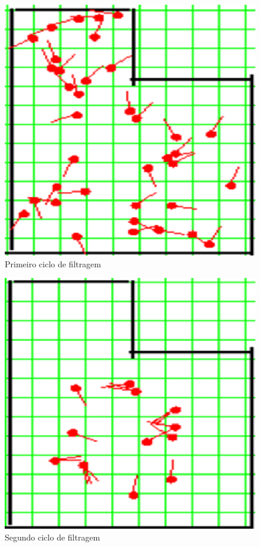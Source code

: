 \begin{figure}[H]
  \centering
  \includegraphics[scale=0.6]{figuras/cen1_ex4/2.eps}
  \caption[Primeiro Ciclo de Filtragem]{Primeiro ciclo de filtragem}
  \label{img:cen1_ex4_2}
\end{figure}

\begin{figure}[H]
  \centering
  \includegraphics[scale=0.6]{figuras/cen1_ex4/3.eps}
  \caption[Segundo Ciclo de Filtragem]{Segundo ciclo de filtragem}
  \label{img:cen1_ex4_3}
\end{figure}

